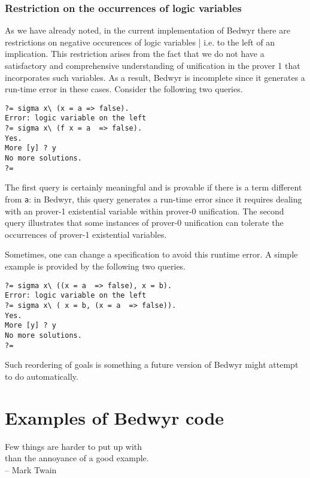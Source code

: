 \documentclass{article}
\begin{document}
\subsubsection{Restriction on the occurrences of logic variables}
\label{restrict-logic-variables}

As we have already noted, in the current implementation of Bedwyr
there are restrictions on negative occurences of logic variables |
i.e. to the left of an implication.
This restriction arises from the fact that we do not
have a satisfactory and comprehensive understanding of unification in
the prover 1 that incorporates such variables.  As a result, Bedwyr
is incomplete since it generates a run-time error in these cases.
Consider the following two queries.
\begin{verbatim}
?= sigma x\ (x = a => false).
Error: logic variable on the left
?= sigma x\ (f x = a  => false).
Yes.
More [y] ? y
No more solutions.
?=
\end{verbatim}
The first query is certainly meaningful and is provable if there is a
term different from {\tt a}: in Bedwyr, this query generates a
run-time error since it requires dealing with an prover-1
existential variable within prover-0 unification. The second query illustrates
that some instances of prover-0 unification can tolerate the 
occurrences of prover-1 existential variables.

Sometimes, one can change a specification to avoid this runtime
error.  A simple example is provided by the following two queries.
\begin{verbatim}
?= sigma x\ ((x = a  => false), x = b).
Error: logic variable on the left
?= sigma x\ ( x = b, (x = a  => false)).
Yes.
More [y] ? y
No more solutions.
?= 
\end{verbatim}
Such reordering of goals is something a future version of Bedwyr might
attempt to do automatically.

\section{Examples of Bedwyr code}

\begin{flushright}
Few things are harder to put up with \\
than the annoyance of a good example. \\ -- Mark Twain
\end{flushright}
\end{document}
